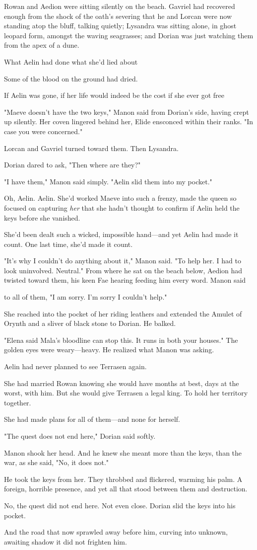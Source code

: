 Rowan and Aedion were sitting silently on the beach. Gavriel had recovered enough from the shock of the oath's severing that he and Lorcan were now standing atop the bluff, talking quietly; Lysandra was sitting alone, in ghost leopard form, amongst the waving seagrasses; and Dorian was just  watching them from the apex of a dune.

What Aelin had done  what she'd lied about 

Some of the blood on the ground had dried.

If Aelin was gone, if her life would indeed be the cost if she ever got free 

"Maeve doesn't have the two keys," Manon said from Dorian's side, having crept up silently. Her coven lingered behind her, Elide ensconced within their ranks. "In case you were concerned."

Lorcan and Gavriel turned toward them. Then Lysandra.

Dorian dared to ask, "Then where are they?"

"I have them," Manon said simply. "Aelin slid them into my pocket."

Oh, Aelin. Aelin. She'd worked Maeve into such a frenzy, made the queen so focused on capturing \emph{her} that she hadn't thought to confirm if Aelin held the keys before she vanished.

She'd been dealt such a wicked, impossible hand---and yet Aelin had made it count. One last time, she'd made it count.

"It's why I couldn't do anything about it," Manon said. "To help her. I had to look uninvolved. Neutral." From where he sat on the beach below, Aedion had twisted toward them, his keen Fae hearing feeding him every word. Manon said

to all of them, "I am sorry. I'm sorry I couldn't help."

She reached into the pocket of her riding leathers and extended the Amulet of Orynth and a sliver of black stone to Dorian. He balked.

"Elena said Mala's bloodline can stop this. It runs in both your houses." The golden eyes were weary---heavy. He realized what Manon was asking.

Aelin had never planned to see Terrasen again.

She had married Rowan knowing she would have months at best, days at the worst, with him. But she would give Terrasen a legal king. To hold her territory together.

She had made plans for all of them---and none for herself.

"The quest does not end here," Dorian said softly.

Manon shook her head. And he knew she meant more than the keys, than the war, as she said, "No, it does not."

He took the keys from her. They throbbed and flickered, warming his palm. A foreign, horrible presence, and yet  all that stood between them and destruction.

No, the quest did not end here. Not even close. Dorian slid the keys into his pocket.

And the road that now sprawled away before him, curving into unknown, awaiting shadow  it did not frighten him.
